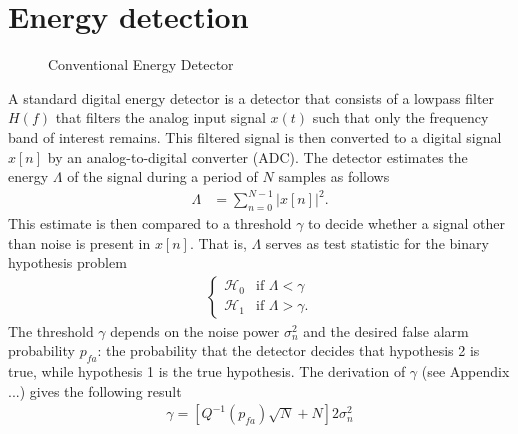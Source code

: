 \documentclass[a4paper, openany, oneside]{memoir}
\begin{document}
\section{Energy detection}

\begin{figure}[H]
\centering
{}
\caption{Conventional Energy Detector}\label{tkz:conv_ed}
\end{figure}
A standard digital energy detector is a detector that consists of a lowpass filter $H(f)$ that filters the analog input signal $x(t)$ such
that only the frequency band of interest remains. This filtered signal is then converted to a digital signal $x[n]$ by an analog-to-digital converter (ADC). The detector estimates the energy $\Lambda$ of the signal during a period of $N$ samples as follows
\begin{align}\label{eq:test_ed}
	\Lambda &= \sum_{n=0}^{N-1} |x[n]|^2.
\end{align}
This estimate is then compared to a threshold $\gamma$ to decide whether a signal other than noise is present in $x[n]$. That is, $\Lambda$ serves as test statistic for the binary hypothesis problem
\begin{align*}
	\begin{cases}
		\mathcal{H}_0 & \text{if } \Lambda < \gamma \\
		\mathcal{H}_1 & \text{if } \Lambda > \gamma.
	\end{cases}
\end{align*}
The threshold $\gamma$ depends on the noise power $\sigma_n^2$  and the desired false alarm probability $p_{fa}$: the probability that the detector decides that hypothesis 2 is true, while hypothesis 1 is the true hypothesis. The derivation of $\gamma$ (see Appendix ...) gives the following result
\begin{align*}
\gamma = \left[Q^{-1}(p_{fa})\sqrt{N} + N\right]2\sigma_n^2
\end{align*}
\end{document}
